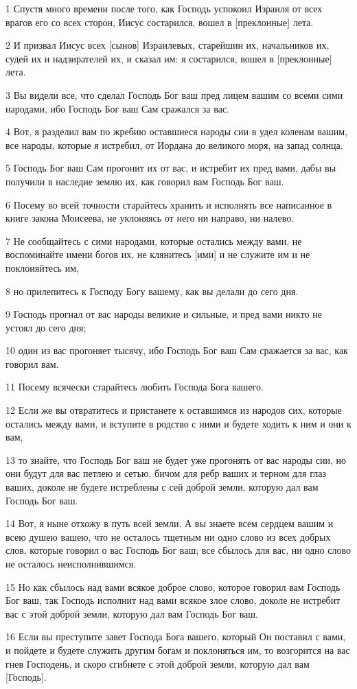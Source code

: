 \par 1 Спустя много времени после того, как Господь успокоил Израиля от всех врагов его со всех сторон, Иисус состарился, вошел в [преклонные] лета.
\par 2 И призвал Иисус всех [сынов] Израилевых, старейшин их, начальников их, судей их и надзирателей их, и сказал им: я состарился, вошел в [преклонные] лета.
\par 3 Вы видели все, что сделал Господь Бог ваш пред лицем вашим со всеми сими народами, ибо Господь Бог ваш Сам сражался за вас.
\par 4 Вот, я разделил вам по жребию оставшиеся народы сии в удел коленам вашим, все народы, которые я истребил, от Иордана до великого моря, на запад солнца.
\par 5 Господь Бог ваш Сам прогонит их от вас, и истребит их пред вами, дабы вы получили в наследие землю их, как говорил вам Господь Бог ваш.
\par 6 Посему во всей точности старайтесь хранить и исполнять все написанное в книге закона Моисеева, не уклоняясь от него ни направо, ни налево.
\par 7 Не сообщайтесь с сими народами, которые остались между вами, не воспоминайте имени богов их, не клянитесь [ими] и не служите им и не поклоняйтесь им,
\par 8 но прилепитесь к Господу Богу вашему, как вы делали до сего дня.
\par 9 Господь прогнал от вас народы великие и сильные, и пред вами никто не устоял до сего дня;
\par 10 один из вас прогоняет тысячу, ибо Господь Бог ваш Сам сражается за вас, как говорил вам.
\par 11 Посему всячески старайтесь любить Господа Бога вашего.
\par 12 Если же вы отвратитесь и пристанете к оставшимся из народов сих, которые остались между вами, и вступите в родство с ними и будете ходить к ним и они к вам,
\par 13 то знайте, что Господь Бог ваш не будет уже прогонять от вас народы сии, но они будут для вас петлею и сетью, бичом для ребр ваших и терном для глаз ваших, доколе не будете истреблены с сей доброй земли, которую дал вам Господь Бог ваш.
\par 14 Вот, я ныне отхожу в путь всей земли. А вы знаете всем сердцем вашим и всею душею вашею, что не осталось тщетным ни одно слово из всех добрых слов, которые говорил о вас Господь Бог ваш; все сбылось для вас, ни одно слово не осталось неисполнившимся.
\par 15 Но как сбылось над вами всякое доброе слово, которое говорил вам Господь Бог ваш, так Господь исполнит над вами всякое злое слово, доколе не истребит вас с этой доброй земли, которую дал вам Господь Бог ваш.
\par 16 Если вы преступите завет Господа Бога вашего, который Он поставил с вами, и пойдете и будете служить другим богам и поклоняться им, то возгорится на вас гнев Господень, и скоро сгибнете с этой доброй земли, которую дал вам [Господь].

